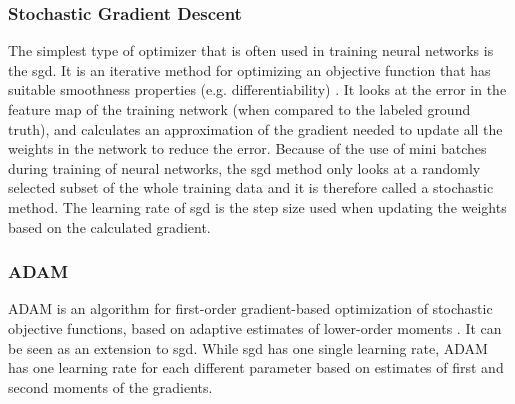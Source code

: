\subsubsection{Stochastic Gradient Descent}
The simplest type of optimizer that is often used in training neural networks is the \gls{sgd}. It is an iterative method for optimizing an objective function that has suitable smoothness properties (e.g. differentiability) \cite{stochasticgradientdescent}. It looks at the error in the feature map of the training network (when compared to the labeled ground truth), and calculates an approximation of the gradient needed to update all the weights in the network to reduce the error. Because of the use of mini batches during training of neural networks, the \gls{sgd} method only looks at a randomly selected subset of the whole training data and it is therefore called a stochastic method. The learning rate of \gls{sgd} is the step size used when updating the weights based on the calculated gradient.

\subsubsection{ADAM}
ADAM is an algorithm for first-order gradient-based optimization of stochastic objective functions, based on adaptive estimates of lower-order moments \cite{kingma2015adam}. It can be seen as an extension to \gls{sgd}. While \gls{sgd} has one single learning rate, ADAM has one learning rate for each different parameter based on estimates of first and second moments of the gradients. 